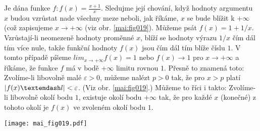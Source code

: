 \wikitextrule
\begin{example}\label{MAI:exam030}
  Je dána funkce \(f: f(x) = \frac{x + 1}{x}\). Sledujme její chování, když hodnoty argumentu \(x\) 
  budou vzrůstat nade všechny meze neboli, jak říkáme, \(x\) se bude blížit k \(+\infty\) (což 
  zapisujeme \(x \to + \infty\) (viz obr. \ref{mai:fig019}). Můžeme psát \(f(x) = 1 + 1/x\). 
  Vzrůstají-li neomezeně hodnoty proměnné \(x\), blíží se hodnoty výrazu \(1/x\) čím dál tím více 
  nule, takže funkční hodnoty \(f(x)\) jsou čím dál tím blíže číslu \(1\). V tomto případě píšeme 
  \(lim_{x\to+\infty} f(x) = 1\) nebo \(f(x) \to 1\) pro \(x\to +\infty\) a říkáme, že funkce \(f\) 
  má v bodě \(+\infty\) limitu rovnou \(1\). Přesně to znamená toto: Zvolíme-li libovolně malé 
  \(\varepsilon > 0\), můžeme nalézt \(p > 0\) tak, že pro \(x > p\) platí \(\abs{f(x) — l} < 
  \varepsilon\). (Viz obr. \ref{mai:fig019}.) Můžeme to říci i takto: Zvolíme-li libovolně okolí 
  bodu \(1\), existuje okolí bodu \(+\infty\) tak, že pro každé \(x\) (konečné) z tohoto okolí je 
  \(f(x)\) ve zvoleném okolí bodu \(1\).
  
  {\centering
   \captionsetup{type=figure}
%   
   \texttt{[image: mai\_fig019.pdf]}
  \par}
\end{example}















